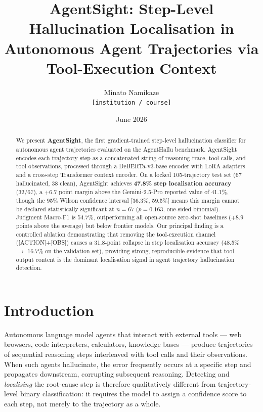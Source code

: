 \documentclass[11pt]{article}
\title{\textbf{AgentSight: Step-Level Hallucination Localisation in Autonomous Agent Trajectories via Tool-Execution Context}}
\author{
  Minato Namikaze \\
  \texttt{[institution / course]}
}
\date{June 2026}
\begin{document}
\maketitle

\begin{abstract}
We present \textbf{AgentSight}, the first gradient-trained step-level hallucination classifier for autonomous agent trajectories evaluated on the AgentHallu benchmark. AgentSight encodes each trajectory step as a concatenated string of reasoning trace, tool calls, and tool observations, processed through a DeBERTa-v3-base encoder with LoRA adapters and a cross-step Transformer context encoder. On a locked 105-trajectory test set (67 hallucinated, 38 clean), AgentSight achieves \textbf{47.8\% step localisation accuracy} (32/67), a $+$6.7 point margin above the Gemini-2.5-Pro reported value of 41.1\%, though the 95\% Wilson confidence interval [36.3\%, 59.5\%] means this margin cannot be declared statistically significant at $n{=}67$ ($p{=}0.163$, one-sided binomial). Judgment Macro-F1 is 54.7\%, outperforming all open-source zero-shot baselines ($+$8.9 points above the average) but below frontier models. Our principal finding is a controlled ablation demonstrating that removing the tool-execution channel ([ACTION]+[OBS]) causes a 31.8-point collapse in step localisation accuracy (48.5\% $\to$ 16.7\% on the validation set), providing strong, reproducible evidence that tool output content is the dominant localisation signal in agent trajectory hallucination detection.
\end{abstract}

\section{Introduction}

Autonomous language model agents that interact with external tools --- web browsers, code interpreters, calculators, knowledge bases --- produce trajectories of sequential reasoning steps interleaved with tool calls and their observations. When such agents hallucinate, the error frequently occurs at a specific step and propagates downstream, corrupting subsequent reasoning. Detecting and \emph{localising} the root-cause step is therefore qualitatively different from trajectory-level binary classification: it requires the model to assign a confidence score to each step, not merely to the trajectory as a whole.
\end{document}
